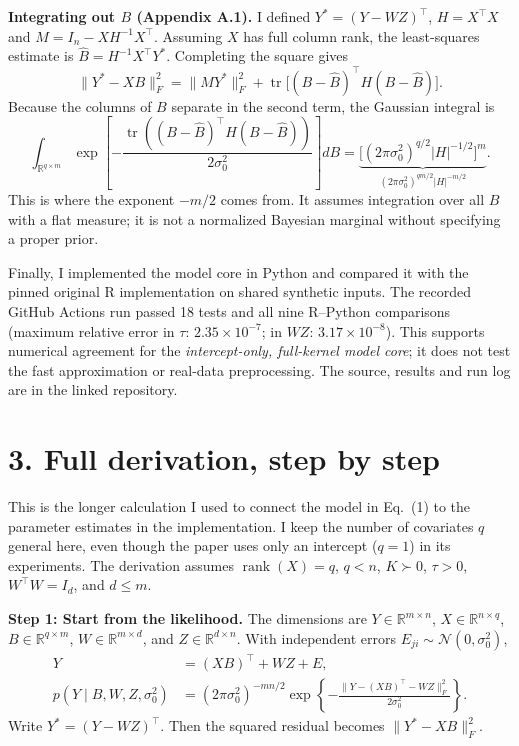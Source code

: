 \documentclass[11pt,letterpaper]{article}
\newcommand{\R}{\mathbb R}
\newcommand{\tr}{\operatorname{tr}}
\begin{document}
\textbf{Integrating out $B$ (Appendix A.1).} I defined $Y^*=(Y-WZ)^\top$, $H=X^\top X$ and $M=I_n-XH^{-1}X^\top$. Assuming $X$ has full column rank, the least-squares estimate is $\widehat B=H^{-1}X^\top Y^*$. Completing the square gives
\begin{equation}
\|Y^*-XB\|_F^2=
\|MY^*\|_F^2+
\tr\!\big[(B-\widehat B)^\top H(B-\widehat B)\big].
\end{equation}
Because the columns of $B$ separate in the second term, the Gaussian integral is
\begin{equation}
\int_{\R^{q\times m}}
\exp\!\left[-\frac{\tr((B-\widehat B)^\top H(B-\widehat B))}{2\sigma_0^2}\right]dB
=\underbrace{\big[(2\pi\sigma_0^2)^{q/2}|H|^{-1/2}\big]^m}_{(2\pi\sigma_0^2)^{qm/2}|H|^{-m/2}}.
\end{equation}
This is where the exponent $-m/2$ comes from. It assumes integration over all $B$ with a flat measure; it is not a normalized Bayesian marginal without specifying a proper prior.

Finally, I implemented the model core in Python and compared it with the pinned original R implementation on shared synthetic inputs. The recorded GitHub Actions run passed 18 tests and all nine R--Python comparisons (maximum relative error in $\tau$: $2.35\times10^{-7}$; in $WZ$: $3.17\times10^{-8}$). This supports numerical agreement for the \emph{intercept-only, full-kernel model core}; it does not test the fast approximation or real-data preprocessing. The source, results and run log are in the linked repository.

\section*{3. Full derivation, step by step}

This is the longer calculation I used to connect the model in Eq.~(1) to the parameter estimates in the implementation. I keep the number of covariates $q$ general here, even though the paper uses only an intercept ($q=1$) in its experiments. The derivation assumes $\operatorname{rank}(X)=q$, $q<n$, $K\succ0$, $\tau>0$, $W^\top W=I_d$, and $d\le m$.

\textbf{Step 1: Start from the likelihood.}
The dimensions are $Y\in\R^{m\times n}$, $X\in\R^{n\times q}$, $B\in\R^{q\times m}$, $W\in\R^{m\times d}$, and $Z\in\R^{d\times n}$. With independent errors $E_{ji}\sim\mathcal N(0,\sigma_0^2)$,
\begin{align}
Y&=(XB)^\top+WZ+E,\\
p(Y\mid B,W,Z,\sigma_0^2)
&=(2\pi\sigma_0^2)^{-mn/2}
\exp\!\left\{-\frac{\|Y-(XB)^\top-WZ\|_F^2}{2\sigma_0^2}\right\}.
\label{eq:full-likelihood}
\end{align}
Write $Y^*=(Y-WZ)^\top$. Then the squared residual becomes $\|Y^*-XB\|_F^2$.
\end{document}
